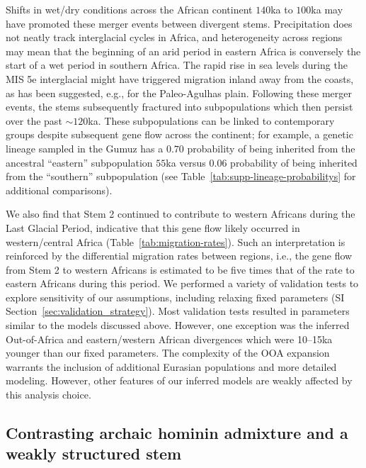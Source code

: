 \documentclass[]{article}
\begin{document}
Shifts in wet/dry conditions across the African continent $140$ka to $100$ka may have
promoted these merger events between divergent stems. 
Precipitation does not neatly track interglacial cycles in Africa,
and heterogeneity across regions may mean that the beginning of an arid period
in eastern Africa is conversely the start of a wet period in
southern Africa\citep{Blome2012-lw}.
The rapid rise in sea levels during the MIS 5e interglacial might have
triggered migration inland away from the
coasts, as has been suggested, e.g., for the Paleo-Agulhas plain\citep{Marean2014-pg}.
Following these merger events, the stems subsequently fractured into
subpopulations which then persist over the past $\sim120$ka. These
subpopulations can be linked to contemporary groups despite subsequent gene
flow across the continent; for example, a genetic lineage sampled in the Gumuz
has a $0.70$ probability of being inherited from the ancestral ``eastern''
subpopulation $55$ka versus $0.06$ probability of being inherited
from the ``southern'' subpopulation (see Table~\ref{tab:supp-lineage-probabilitys} for
additional comparisons). 

We also find that Stem 2 continued to contribute to western Africans during the
Last Glacial Period, indicative that this gene flow likely occurred in
western/central Africa (Table~\ref{tab:migration-rates}). Such an
interpretation is reinforced by the differential migration rates between
regions, i.e., the gene flow from Stem 2 to western Africans is estimated to be
five times that of the rate to eastern Africans during this period. We
performed a variety of validation tests to explore sensitivity of our
assumptions, including relaxing fixed parameters (SI
Section~\ref{sec:validation_strategy}). Most validation tests resulted in
parameters similar to the models discussed above. However, one exception was
the inferred Out-of-Africa and eastern/western African divergences which were
10--15ka younger than our fixed parameters. The
complexity of the OOA expansion warrants the inclusion of additional Eurasian populations 
and more detailed modeling. However, other features
of our inferred models are weakly affected by this analysis choice.

\subsection*{Contrasting archaic hominin admixture and a weakly structured stem}
\end{document}
